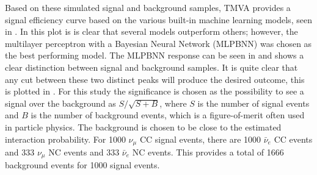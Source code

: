 Based on these simulated signal and background samples, TMVA provides a signal efficiency curve based on the various built-in machine learning models, seen in . In this plot is is clear that several models outperform others; however, the multilayer perceptron with a Bayesian Neural Network (MLPBNN) was chosen as the best performing model. The MLPBNN response can be seen in  and shows a clear distinction between signal and background samples. It is quite clear that any cut between these two distinct peaks will produce the desired outcome, this is plotted in . For this study the significance is chosen as the possibility to see a signal over the background as $S/\sqrt{S+B}$, where $S$ is the number of signal events and $B$ is the number of background events, which is a figure-of-merit often used in particle physics. The background is chosen to be close to the estimated interaction probability. For 1000 $\nu_\mu$ CC signal events, there are 1000 $\bar{\nu}_e$ CC events and 333 $\nu_\mu$ NC events and 333 $\bar{\nu}_e$ NC events. This provides a total of 1666 background events for 1000 signal events.






